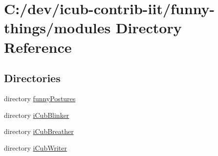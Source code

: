 \section{C\+:/dev/icub-\/contrib-\/iit/funny-\/things/modules Directory Reference}
\label{dir_e05d7e2b1ecd646af5bb94391405f3b5}
\subsection*{Directories}
\begin{DoxyCompactItemize}
\item 
directory \hyperlink{dir_e2199ffcfb439558047501eb9fbf08f7}{funny\+Postures}
\item 
directory \hyperlink{dir_168c181400fec304cc264e27f0466640}{i\+Cub\+Blinker}
\item 
directory \hyperlink{dir_b2138086760751ed5b6c2f534d2e016b}{i\+Cub\+Breather}
\item 
directory \hyperlink{dir_2eaa63838c4470da3bc214ebca123b03}{i\+Cub\+Writer}
\end{DoxyCompactItemize}
